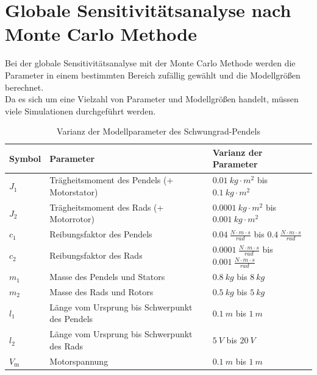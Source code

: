 \section{Globale Sensitivitätsanalyse nach Monte Carlo Methode}
Bei der globale Sensitivitätsanalyse mit der Monte Carlo Methode werden die Parameter in einem bestimmten Bereich zufällig gewählt und die Modellgrößen berechnet.\\
Da es sich um eine Vielzahl von Parameter und Modellgrößen handelt, müssen viele Simulationen durchgeführt werden.\\
\begin{table}[H]
    \centering
    \begin{tabular}{|lll|}
        \hline
        \rowcolor{grey}
        \textbf{Symbol}     & \textbf{Parameter}                                & \textbf{Varianz der Parameter}                         \\ \hline
        $J_{\mathrm{1}}$    & Trägheitsmoment des Pendels (+ Motorstator)       & $\SI{0.01}{kg \cdot m^2}$ bis $\SI{0.1}{kg \cdot m^2}$                  \\
        $J_{\mathrm{2}}$    & Trägheitsmoment des Rads (+ Motorrotor)           & $\SI{0.0001}{kg \cdot m^2} $ bis $\SI{0.001}{kg \cdot m^2}$               \\
        $c_{\mathrm{1}}$    & Reibungsfaktor des Pendels                        & $\SI{0.04}{\frac{N \cdot m \cdot s}{rad}}$ bis $\SI{0.4}{\frac{N \cdot m \cdot s}{rad}}$    \\
        $c_{\mathrm{2}}$    & Reibungsfaktor des Rads                           & $\SI{0.0001}{\frac{N \cdot m \cdot s}{rad}}$ bis $\SI{0.001}{\frac{N \cdot m \cdot s}{rad}}$  \\
        $m_{\mathrm{1}}$    & Masse des Pendels und Stators                     & $\SI{0.8}{kg}$ bis $\SI{8}{kg}$                              \\
        $m_{\mathrm{2}}$    & Masse des Rads und Rotors                         & $\SI{0.5}{kg}$ bis $\SI{5}{kg}$                              \\
        $l_{\mathrm{1}}$    & Länge vom Ursprung bis Schwerpunkt des Pendels    & $\SI{0.1}{m}$ bis $\SI{1}{m}$                              \\
        $l_{\mathrm{2}}$    & Länge vom Ursprung bis Schwerpunkt des Rads       & $\SI{5}{V}$ bis $\SI{20}{V}$  \\
        $V_{\mathrm{m}}$    & Motorspannung       & $\SI{0.1}{m}$ bis $\SI{1}{m}$                                \\ \hline
    \end{tabular}
    \caption{Varianz der Modellparameter des Schwungrad-Pendels}
    \label{tab:varianz_parameter}
\end{table}

